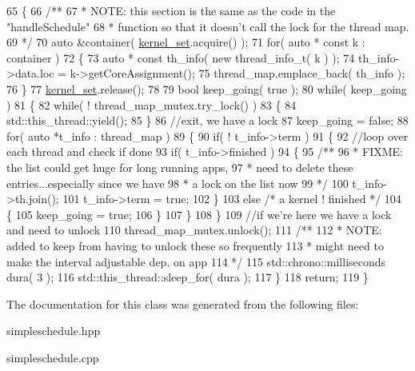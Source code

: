 \begin{DoxyCode}
65 \{\textcolor{comment}{}
66 \textcolor{comment}{   /** }
67 \textcolor{comment}{    * NOTE: this section is the same as the code in the "handleSchedule"}
68 \textcolor{comment}{    * function so that it doesn't call the lock for the thread map.}
69 \textcolor{comment}{    */}
70    \textcolor{keyword}{auto} &container( \hyperlink{class_schedule_a1a448b0d48e656f94db65a70cedd8eed}{kernel\_set}.acquire() );
71    \textcolor{keywordflow}{for}( \textcolor{keyword}{auto} * \textcolor{keyword}{const} k : container )
72    \{  
73       \textcolor{keyword}{auto} * \textcolor{keyword}{const} th\_info( \textcolor{keyword}{new} thread\_info\_t( k ) );
74       th\_info->data.loc = k->getCoreAssignment();
75       thread\_map.emplace\_back( th\_info );
76    \}
77    \hyperlink{class_schedule_a1a448b0d48e656f94db65a70cedd8eed}{kernel\_set}.release();
78    
79    \textcolor{keywordtype}{bool} keep\_going( \textcolor{keyword}{true} );
80    \textcolor{keywordflow}{while}( keep\_going )
81    \{
82       \textcolor{keywordflow}{while}( ! thread\_map\_mutex.try\_lock() )
83       \{
84          std::this\_thread::yield();
85       \}     
86       \textcolor{comment}{//exit, we have a lock}
87       keep\_going = \textcolor{keyword}{false};
88       \textcolor{keywordflow}{for}( \textcolor{keyword}{auto}  *t\_info : thread\_map )
89       \{
90          \textcolor{keywordflow}{if}( ! t\_info->term )
91          \{
92             \textcolor{comment}{//loop over each thread and check if done}
93             \textcolor{keywordflow}{if}( t\_info->finished )
94             \{\textcolor{comment}{}
95 \textcolor{comment}{               /**}
96 \textcolor{comment}{                * FIXME: the list could get huge for long running apps,}
97 \textcolor{comment}{                * need to delete these entries...especially since we have}
98 \textcolor{comment}{                * a lock on the list now }
99 \textcolor{comment}{                */}
100                t\_info->th.join();
101                t\_info->term = \textcolor{keyword}{true};
102             \}
103             \textcolor{keywordflow}{else} \textcolor{comment}{/* a kernel ! finished */}
104             \{
105                keep\_going =  \textcolor{keyword}{true};
106             \}
107          \}
108       \}
109       \textcolor{comment}{//if we're here we have a lock and need to unlock}
110       thread\_map\_mutex.unlock();\textcolor{comment}{}
111 \textcolor{comment}{      /**}
112 \textcolor{comment}{       * NOTE: added to keep from having to unlock these so frequently}
113 \textcolor{comment}{       * might need to make the interval adjustable dep. on app}
114 \textcolor{comment}{       */}
115       std::chrono::milliseconds dura( 3 );
116       std::this\_thread::sleep\_for( dura );
117    \}
118    \textcolor{keywordflow}{return};
119 \}
\end{DoxyCode}


The documentation for this class was generated from the following files\+:\begin{DoxyCompactItemize}
\item 
simpleschedule.\+hpp\item 
simpleschedule.\+cpp\end{DoxyCompactItemize}
